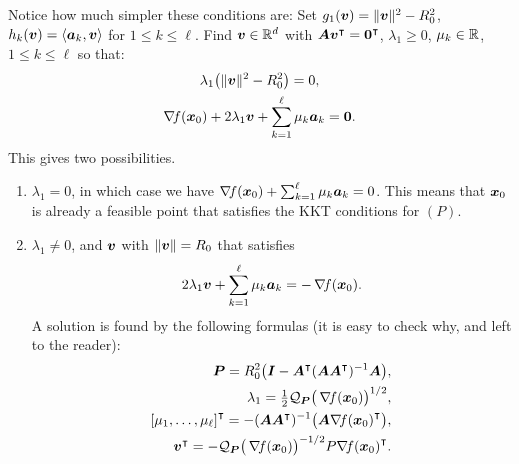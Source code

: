 Notice how much simpler these conditions are: Set $g_1(\boldsymbol{v}) = \lVert \boldsymbol{v} \rVert^2-R_0^2$, $h_k(\boldsymbol{v}) = \langle \boldsymbol{a}_k, \boldsymbol{v} \rangle$ for $1\leq k \leq \ell$.  Find $\boldsymbol{v} \in \mathbb{R}^d$ with $\boldsymbol{A}{\boldsymbol{v}}^\intercal = {\boldsymbol{0}}^\intercal$, $\lambda_1 \geq 0$, $\mu_k \in \mathbb{R}$, $1\leq k \leq \ell$ so that:
\begin{gather*}
\lambda_1 \big( \lVert \boldsymbol{v} \rVert^2 - R_0^2 \big) = 0, \\
\mathop{\nabla\! {f}}(\boldsymbol{x}_0) + 2\lambda_1 \boldsymbol{v} + \sum_{k=1}^\ell \mu_k \boldsymbol{a}_k = \boldsymbol{0}.
\end{gather*}
This gives two possibilities.
\begin{enumerate}
	\item $\lambda_1 = 0$, in which case we have $\mathop{\nabla\! {f}}(\boldsymbol{x}_0) + \sum_{k=1}^\ell \mu_k \boldsymbol{a}_k=0$.  This means that $\boldsymbol{x}_0$ is already a feasible point that satisfies the KKT conditions for $(P)$.
	\item $\lambda_1 \neq 0$, and $\boldsymbol{v}$ with $\lVert \boldsymbol{v} \rVert = R_0$ that satisfies
	\begin{equation*}
	2\lambda_1 \boldsymbol{v} + \sum_{k=1}^\ell \mu_k \boldsymbol{a}_k = - \mathop{\nabla\! {f}}(\boldsymbol{x}_0).
	\end{equation*}
	A solution is found by the following formulas (it is easy to check why, and left to the reader):
	\begin{equation}\label{equation:projMethodsFormulae}
	\begin{split}
	\boldsymbol{P} = R_0^2 \big( \boldsymbol{I} - {\boldsymbol{A}}^\intercal ( \boldsymbol{A} {\boldsymbol{A}}^\intercal )^{-1} \boldsymbol{A} \big), \\
	\lambda_1 = \tfrac{1}{2} \mathcal{Q}_{\boldsymbol{P}}\big(\mathop{\nabla\! {f}}(\boldsymbol{x}_0)\big)^{1/2}, \\
	{[\mu_1, \dotsc, \mu_\ell]}^\intercal = -(\boldsymbol{A}{\boldsymbol{A}}^\intercal)^{-1} \big( \boldsymbol{A}{\mathop{\nabla\! {f}}(\boldsymbol{x}_0)}^\intercal \big), \\
	{\boldsymbol{v}}^\intercal = -\mathcal{Q}_{\boldsymbol{P}}\big(\mathop{\nabla\! {f}}(\boldsymbol{x}_0)\big)^{-1/2} P {\mathop{\nabla\! {f}}(\boldsymbol{x}_0)}^\intercal.
	\end{split}
	\end{equation}
\end{enumerate}

